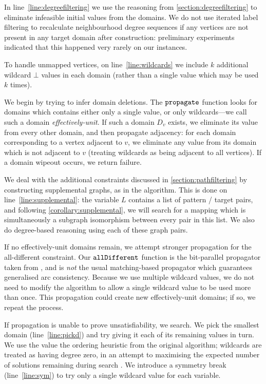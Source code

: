 \documentclass[letterpaper]{article}
\newcommand{\citet}[1]{\citeauthor{#1} \shortcite{#1}}
\newcommand{\citep}[1]{\cite{#1}}
\theoremstyle{definition}
\begin{document}
In line~\ref{line:degreefiltering} we use the reasoning from \cref{section:degreefiltering} to
eliminate infeasible initial values from the domains. We do not use iterated label filtering
\citep{constraints10} to recalculate neighbourhood degree sequences if any vertices are not present
in any target domain after construction: preliminary experiments indicated that this happened very
rarely on our instances.

To handle unmapped vertices, on line~\ref{line:wildcards} we include $k$ additional wildcard $\bot$
values in each domain (rather than a single value which may be used $k$ times).

We begin by trying to infer domain deletions. The $\FuncSty{propagate}$ function looks for domains
which contains either only a single value, or only wildcards---we call such a domain
\emph{effectively-unit}. If such a domain $D_v$ exists, we eliminate its value from every other domain,
and then propagate adjacency: for each domain corresponding to a vertex adjacent to $v$, we
eliminate any value from its domain which is not adjacent to $v$ (treating wildcards as being
adjacent to all vertices). If a domain wipeout occurs, we return failure.

We deal with the additional constraints discussed in \cref{section:pathfiltering} by constructing
supplemental graphs, as in the \citet{DBLP:conf/cp/McCreeshP15} algorithm. This is done on
line~\ref{line:supplemental}: the variable $L$ contains a list of pattern / target pairs, and
following \cref{corollary:supplemental}, we will search for a mapping which is simultaneously a
subgraph isomorphism between every pair in this list. We also do degree-based reasoning using each
of these graph pairs.

If no effectively-unit domains remain, we attempt stronger propagation for the all-different
constraint. Our $\FuncSty{allDifferent}$ function is the bit-parallel propagator taken from
\citet{DBLP:conf/cp/McCreeshP15}, and is \emph{not} the usual matching-based propagator
\citep{DBLP:conf/aaai/Regin94} which guarantees generalised arc consistency. Because we use multiple
wildcard values, we do not need to modify the algorithm to allow a single wildcard value to be used
more than once. This propagation could create new effectively-unit domains; if so, we repeat the
process.

If propagation is unable to prove unsatisfiability, we search. We pick the smallest domain
(line~\ref{line:pickd}) and try giving it each of its remaining values in turn. We use the value the
ordering heuristic from the original algorithm; wildcards are treated as having degree zero, in an
attempt to maximising the expected number of solutions remaining during search
\citep{DBLP:conf/ijcai/McCreeshPT16}.  We introduce a symmetry break (line~\ref{line:sym}) to try
only a single wildcard value for each variable.
\end{document}
